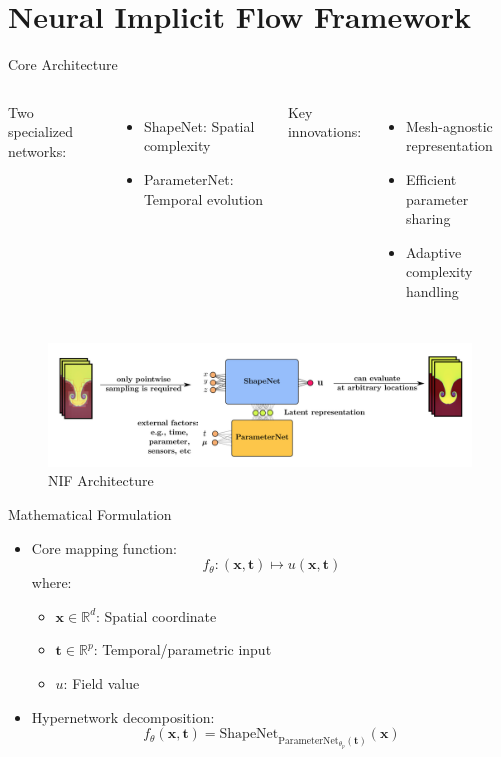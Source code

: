 \documentclass{beamer}
\begin{document}
\section{Neural Implicit Flow Framework}
\begin{frame}{Core Architecture}
    \begin{columns}
        Two specialized networks:
        \begin{itemize}
            \item ShapeNet: Spatial complexity
            \item ParameterNet: Temporal evolution
        \end{itemize}

        Key innovations:
        \begin{itemize}
            \item Mesh-agnostic representation
            \item Efficient parameter sharing
            \item Adaptive complexity handling
        \end{itemize}        
    \end{columns}
    \begin{figure}
        \includegraphics[width=\textwidth]{../../20-minute-presentation/latex/hypernetwork_diagram}
        \caption{NIF Architecture}
    \end{figure}
\end{frame}

\begin{frame}{Mathematical Formulation}
    \begin{itemize}
        \item Core mapping function:
        \[ f_\theta: (\mathbf{x}, \mathbf{t}) \mapsto u(\mathbf{x}, \mathbf{t}) \]
        where:
        \begin{itemize}
            \item $\mathbf{x} \in \mathbb{R}^d$: Spatial coordinate
            \item $\mathbf{t} \in \mathbb{R}^p$: Temporal/parametric input
            \item $u$: Field value
        \end{itemize}
        \item Hypernetwork decomposition:
        \[ f_\theta(\mathbf{x}, \mathbf{t}) = \text{ShapeNet}_{\text{ParameterNet}_{\theta_p}(\mathbf{t})}(\mathbf{x}) \]
    \end{itemize}
\end{frame}
\end{document}
